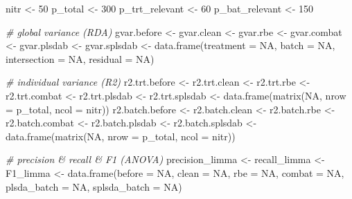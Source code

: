\documentclass[
]{book}
\newenvironment{Shaded}{\begin{snugshade}}{\end{snugshade}}
\newcommand{\AttributeTok}[1]{\textcolor[rgb]{0.77,0.63,0.00}{#1}}
\newcommand{\CommentTok}[1]{\textcolor[rgb]{0.56,0.35,0.01}{\textit{#1}}}
\newcommand{\ConstantTok}[1]{\textcolor[rgb]{0.00,0.00,0.00}{#1}}
\newcommand{\DecValTok}[1]{\textcolor[rgb]{0.00,0.00,0.81}{#1}}
\newcommand{\FunctionTok}[1]{\textcolor[rgb]{0.00,0.00,0.00}{#1}}
\newcommand{\NormalTok}[1]{#1}
\newcommand{\OtherTok}[1]{\textcolor[rgb]{0.56,0.35,0.01}{#1}}
\begin{document}
\begin{Shaded}
\begin{Highlighting}[]
\NormalTok{nitr }\OtherTok{\textless{}{-}} \DecValTok{50}
\NormalTok{p\_total }\OtherTok{\textless{}{-}} \DecValTok{300}
\NormalTok{p\_trt\_relevant }\OtherTok{\textless{}{-}} \DecValTok{60}
\NormalTok{p\_bat\_relevant }\OtherTok{\textless{}{-}} \DecValTok{150}

\CommentTok{\# global variance (RDA)}
\NormalTok{gvar.before }\OtherTok{\textless{}{-}}\NormalTok{ gvar.clean }\OtherTok{\textless{}{-}}\NormalTok{ gvar.rbe }\OtherTok{\textless{}{-}}\NormalTok{ gvar.combat }\OtherTok{\textless{}{-}} 
\NormalTok{  gvar.plsdab }\OtherTok{\textless{}{-}}\NormalTok{ gvar.splsdab }\OtherTok{\textless{}{-}} \FunctionTok{data.frame}\NormalTok{(}\AttributeTok{treatment =} \ConstantTok{NA}\NormalTok{, }\AttributeTok{batch =} \ConstantTok{NA}\NormalTok{,  }
                                            \AttributeTok{intersection =} \ConstantTok{NA}\NormalTok{, }
                                            \AttributeTok{residual =} \ConstantTok{NA}\NormalTok{)}

\CommentTok{\# individual variance (R2)}
\NormalTok{r2.trt.before }\OtherTok{\textless{}{-}}\NormalTok{ r2.trt.clean }\OtherTok{\textless{}{-}}\NormalTok{ r2.trt.rbe  }\OtherTok{\textless{}{-}}\NormalTok{ r2.trt.combat }\OtherTok{\textless{}{-}} 
\NormalTok{  r2.trt.plsdab }\OtherTok{\textless{}{-}}\NormalTok{ r2.trt.splsdab }\OtherTok{\textless{}{-}} \FunctionTok{data.frame}\NormalTok{(}\FunctionTok{matrix}\NormalTok{(}\ConstantTok{NA}\NormalTok{, }\AttributeTok{nrow =}\NormalTok{ p\_total, }
                                                       \AttributeTok{ncol =}\NormalTok{ nitr))}
\NormalTok{r2.batch.before }\OtherTok{\textless{}{-}}\NormalTok{ r2.batch.clean }\OtherTok{\textless{}{-}}\NormalTok{ r2.batch.rbe  }\OtherTok{\textless{}{-}}\NormalTok{ r2.batch.combat }\OtherTok{\textless{}{-}} 
\NormalTok{  r2.batch.plsdab }\OtherTok{\textless{}{-}}\NormalTok{ r2.batch.splsdab }\OtherTok{\textless{}{-}} \FunctionTok{data.frame}\NormalTok{(}\FunctionTok{matrix}\NormalTok{(}\ConstantTok{NA}\NormalTok{, }\AttributeTok{nrow =}\NormalTok{ p\_total, }
                                                           \AttributeTok{ncol =}\NormalTok{ nitr))}

\CommentTok{\# precision \& recall \& F1 (ANOVA)}
\NormalTok{precision\_limma }\OtherTok{\textless{}{-}}\NormalTok{ recall\_limma }\OtherTok{\textless{}{-}}\NormalTok{ F1\_limma }\OtherTok{\textless{}{-}} 
  \FunctionTok{data.frame}\NormalTok{(}\AttributeTok{before =} \ConstantTok{NA}\NormalTok{, }\AttributeTok{clean =} \ConstantTok{NA}\NormalTok{, }\AttributeTok{rbe =} \ConstantTok{NA}\NormalTok{, }\AttributeTok{combat =} \ConstantTok{NA}\NormalTok{, }
             \AttributeTok{plsda\_batch =} \ConstantTok{NA}\NormalTok{, }\AttributeTok{splsda\_batch =} \ConstantTok{NA}\NormalTok{)}


\end{Highlighting}
\end{Shaded}
\end{document}
